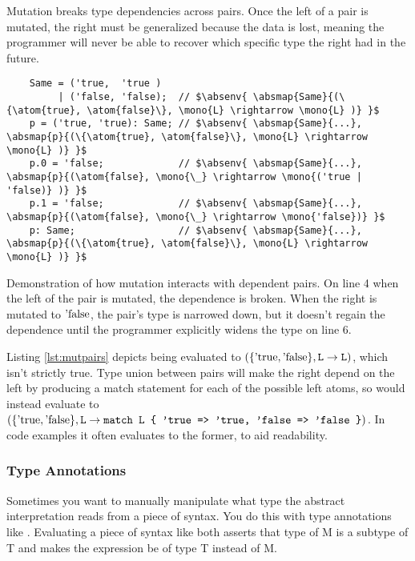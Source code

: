 \documentclass[12pt,twoside]{report}
\begin{document}
Mutation breaks type dependencies across pairs. Once the left of a pair is mutated, the right must be generalized because the data is lost, meaning the programmer will never be able to recover which specific type the right had in the future.

\begin{listing}[H]
  \begin{verbatim}
    Same = ('true,  'true )
         | ('false, 'false);  // $\absenv{ \absmap{Same}{(\{\atom{true}, \atom{false}\}, \mono{L} \rightarrow \mono{L} )} }$
    p = ('true, 'true): Same; // $\absenv{ \absmap{Same}{...}, \absmap{p}{(\{\atom{true}, \atom{false}\}, \mono{L} \rightarrow \mono{L} )} }$
    p.0 = 'false;             // $\absenv{ \absmap{Same}{...}, \absmap{p}{(\atom{false}, \mono{\_} \rightarrow \mono{('true | 'false)} )} }$
    p.1 = 'false;             // $\absenv{ \absmap{Same}{...}, \absmap{p}{(\atom{false}, \mono{\_} \rightarrow \mono{'false})} }$
    p: Same;                  // $\absenv{ \absmap{Same}{...}, \absmap{p}{(\{\atom{true}, \atom{false}\}, \mono{L} \rightarrow \mono{L} )} }$
  \end{verbatim}
  \caption{Demonstration of how mutation interacts with dependent pairs. On line 4 when the left of the pair is mutated, the dependence is broken. When the right is mutated to $\atom{false}$, the pair's type is narrowed down, but it doesn't regain the dependence until the programmer explicitly widens the type on line 6.}
  \label{lst:mutpairs}
\end{listing}

Listing \ref{lst:mutpairs} depicts  being evaluated to $(\{\text{'true}, \text{'false}\}, \text{\texttt{L}} \rightarrow \text{\texttt{L}})$, which isn't strictly true. Type union between pairs will make the right depend on the left by producing a match statement for each of the possible left atoms, so  would instead evaluate to $(\{\text{'true}, \text{'false}\}, \text{\texttt{L}} \rightarrow \text{\texttt{match L \{ 'true => 'true, 'false => 'false \}}})$. In code examples it often evaluates to the former, to aid readability.

\subsubsection{Type Annotations}
Sometimes you want to manually manipulate what type the abstract interpretation reads from a piece of syntax. You do this with type annotations like . Evaluating a piece of syntax like  both asserts that type of M is a subtype of T and makes the expression be of type T instead of M.
\end{document}
